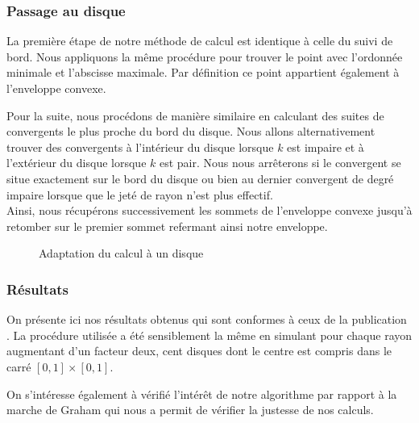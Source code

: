 
\subsubsection{Passage au disque}

La première étape de notre méthode de calcul est identique à celle du suivi de bord. Nous appliquons la même procédure pour trouver le point avec l'ordonnée minimale et l'abscisse maximale. Par définition ce point appartient également à l'enveloppe convexe. 

Pour la suite, nous procédons de manière similaire en calculant des suites de convergents le plus proche du bord du disque. Nous allons alternativement trouver des convergents à l'intérieur du disque lorsque $k$ est impaire et à l'extérieur du disque lorsque $k$ est pair. Nous nous arrêterons si le convergent se situe exactement sur le bord du disque ou bien au dernier convergent de degré impaire lorsque que le jeté de rayon n'est plus effectif.\\

Ainsi, nous récupérons successivement les sommets de l'enveloppe convexe jusqu'à retomber sur le premier sommet refermant ainsi notre enveloppe.

\begin{figure}[h!]
  \centering
  \caption{Adaptation du calcul à un disque}
\end{figure}

\subsubsection{Résultats}

On présente ici nos résultats obtenus qui sont conformes à ceux de la publication \cite{HarPeled98}. La procédure utilisée a été sensiblement la même en simulant pour chaque rayon augmentant d'un facteur deux, cent disques dont le centre est compris dans le carré $[0,1]\times[0,1]$.

On s'intéresse également à vérifié l'intérêt de notre algorithme par rapport à la marche de Graham qui nous a permit de vérifier la justesse de nos calculs. 

